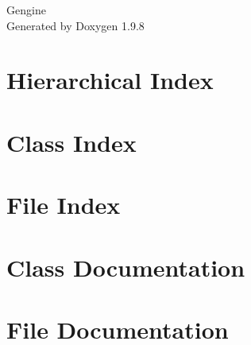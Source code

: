 \documentclass[twoside]{book}
\newcommand{\+}{\discretionary{\mbox{\scriptsize$\hookleftarrow$}}{}{}}
\newcommand{\clearemptydoublepage}{%
    \newpage{\pagestyle{empty}\cleardoublepage}%
  }
\begin{document}
  \raggedbottom
    \hypersetup{pageanchor=false,
                bookmarksnumbered=true,
                pdfencoding=unicode
               }
  \begin{titlepage}
  \vspace*{7cm}
  \begin{center}%
  {\Large Gengine}\\
  \vspace*{1cm}
  {\large Generated by Doxygen 1.9.8}\\
  \end{center}
  \end{titlepage}
  \clearemptydoublepage
  \tableofcontents
  \clearemptydoublepage
  \hypersetup{pageanchor=true}
\chapter{Hierarchical Index}

\chapter{Class Index}

\chapter{File Index}

\chapter{Class Documentation}



















\chapter{File Documentation}



















  \backmatter
  \newpage
  \clearemptydoublepage
  \printindex
\end{document}
